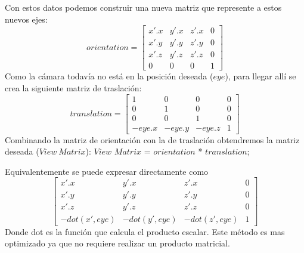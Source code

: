 \documentclass[a4paper]{article}
\begin{document}
    
Con estos datos podemos construir una nueva matriz que represente a estos nuevos ejes:
\[
orientation =
\begin{bmatrix}
x'.x & y'.x & z'.x & 0 \\
x'.y & y'.y & z'.y & 0 \\
x'.z & y'.z & z'.z & 0 \\
0 & 0 & 0 & 1      
\end{bmatrix} 
\]
Como la cámara todavía no está en la posición deseada ($eye$), para llegar allí se crea la siguiente matriz de traslación: \newline 
\[
translation =
\begin{bmatrix}
1 & 0 & 0 & 0 \\
0 & 1 & 0 & 0 \\ 
0 & 0 & 1 & 0 \\
-eye.x & -eye.y & -eye.z & 1 
\end{bmatrix}
\]
 Combinando la matriz de orientación con la de traslación obtendremos la matriz deseada ($View\ Matrix$):  \newline
  $View$ $Matrix$ = $orientation$ * $translation$;
  
  
Equivalentemente se puede expresar directamente como
\[
\begin{bmatrix}
x'.x & y'.x & z'.x & 0 \\ 
x'.y & y'.y & z'.y & 0 \\
x'.z & y'.z & z'.z & 0 \\
-dot(x', eye) & -dot(y', eye) & -dot(z', eye) & 1    
\end{bmatrix}
\]
Donde dot es la función que calcula el producto escalar. Este método es mas optimizado ya que no requiere realizar un producto matricial.
\end{document}
